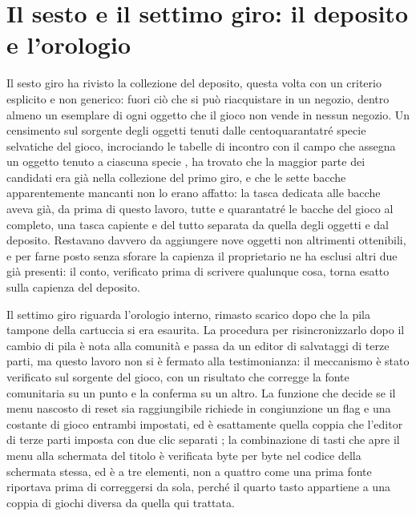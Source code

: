 \section{Il sesto e il settimo giro: il deposito e l'orologio}

Il sesto giro ha rivisto la collezione del deposito, questa volta con un criterio esplicito e non generico: fuori ciò che si può riacquistare in un negozio, dentro almeno un esemplare di ogni oggetto che il gioco non vende in nessun negozio. Un censimento sul sorgente degli oggetti tenuti dalle centoquarantatré specie selvatiche del gioco, incrociando le tabelle di incontro con il campo che assegna un oggetto tenuto a ciascuna specie \cite{pokeemerald}, ha trovato che la maggior parte dei candidati era già nella collezione del primo giro, e che le sette bacche apparentemente mancanti non lo erano affatto: la tasca dedicata alle bacche aveva già, da prima di questo lavoro, tutte e quarantatré le bacche del gioco al completo, una tasca capiente e del tutto separata da quella degli oggetti e dal deposito. Restavano davvero da aggiungere nove oggetti non altrimenti ottenibili, e per farne posto senza sforare la capienza il proprietario ne ha esclusi altri due già presenti: il conto, verificato prima di scrivere qualunque cosa, torna esatto sulla capienza del deposito.

Il settimo giro riguarda l'orologio interno, rimasto scarico dopo che la pila tampone della cartuccia si era esaurita. La procedura per risincronizzarlo dopo il cambio di pila è nota alla comunità e passa da un editor di salvataggi di terze parti, ma questo lavoro non si è fermato alla testimonianza: il meccanismo è stato verificato sul sorgente del gioco, con un risultato che corregge la fonte comunitaria su un punto e la conferma su un altro. La funzione che decide se il menu nascosto di reset sia raggiungibile richiede in congiunzione un flag e una costante di gioco entrambi impostati, ed è esattamente quella coppia che l'editor di terze parti imposta con due clic separati \cite{pokeemerald}; la combinazione di tasti che apre il menu alla schermata del titolo è verificata byte per byte nel codice della schermata stessa, ed è a tre elementi, non a quattro come una prima fonte riportava prima di correggersi da sola, perché il quarto tasto appartiene a una coppia di giochi diversa da quella qui trattata.

